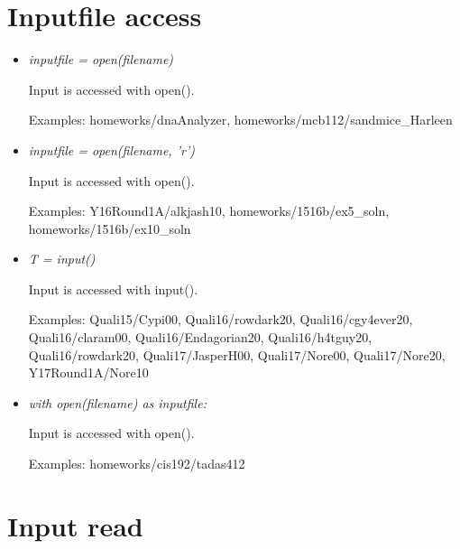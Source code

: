 \documentclass[11pt]{article}
\begin{document}

\section{Inputfile access}

\begin{itemize}
\item \textit{inputfile = open(filename)} 

Input is accessed with open(). 

Examples: homeworks/dnaAnalyzer, homeworks/mcb112/sandmice\_Harleen

\item \textit{inputfile = open(filename, 'r')} 

Input is accessed with open(). 

Examples: Y16Round1A/alkjash10, homeworks/1516b/ex5\_soln, homeworks/1516b/ex10\_soln

\item \textit{T = input()} 

Input is accessed with input(). 

Examples: Quali15/Cypi00, Quali16/rowdark20, Quali16/cgy4ever20, Quali16/claram00, Quali16/Endagorian20, Quali16/h4tguy20, Quali16/rowdark20, Quali17/JasperH00, Quali17/Nore00, Quali17/Nore20, Y17Round1A/Nore10

\item \textit{with open(filename) as inputfile:} 

Input is accessed with open(). 

Examples: homeworks/cis192/tadas412
\end{itemize}

\section{Input read}
\end{document}
